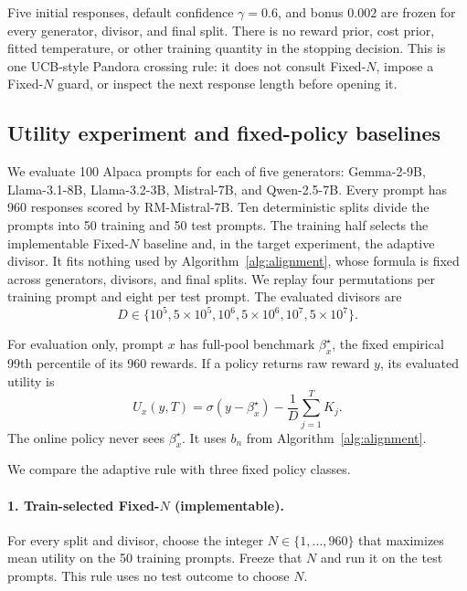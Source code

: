 Five initial responses, default confidence $\gamma=0.6$, and bonus $0.002$ are
frozen for every generator, divisor, and final split.
There is no reward prior, cost prior, fitted temperature, or other training
quantity in the stopping decision.  This is one UCB-style Pandora crossing
rule: it does not consult Fixed-$N$, impose a Fixed-$N$ guard, or inspect the
next response length before opening it.

\subsection{Utility experiment and fixed-policy baselines}
\label{sec:alignment-experiment}

We evaluate 100 Alpaca prompts for each of five generators: Gemma-2-9B,
Llama-3.1-8B, Llama-3.2-3B, Mistral-7B, and Qwen-2.5-7B.  Every prompt has
960 responses scored by RM-Mistral-7B.  Ten deterministic splits divide the
prompts into 50 training and 50 test prompts.  The training half selects the
implementable Fixed-$N$ baseline and, in the target experiment, the adaptive
divisor.  It fits nothing used by Algorithm~\ref{alg:alignment}, whose formula
is fixed across generators, divisors, and final splits.  We replay four
permutations per training prompt and eight per test prompt.  The evaluated
divisors are
\begin{equation}
 D\in\{10^5,5\!\times\!10^5,10^6,5\!\times\!10^6,10^7,5\!\times\!10^7\}.
\end{equation}

For evaluation only, prompt $x$ has full-pool benchmark $\beta_x^\star$, the
fixed empirical 99th percentile of its 960 rewards.  If a policy returns raw
reward $y$, its evaluated utility is
\begin{equation}
 U_x(y,T)=\sigma(y-\beta_x^\star)
          -\frac{1}{D}\sum_{j=1}^{T}K_j.
 \label{eq:alignment-evaluation}
\end{equation}
The online policy never sees $\beta_x^\star$.  It uses $b_n$ from
Algorithm~\ref{alg:alignment}.

We compare the adaptive rule with three fixed policy classes.

\paragraph{1. Train-selected Fixed-$N$ (implementable).}
For every split and divisor, choose the integer $N\in\{1,\ldots,960\}$ that
maximizes mean utility on the 50 training prompts.  Freeze that $N$ and run it
on the test prompts.  This rule uses no test outcome to choose $N$.

